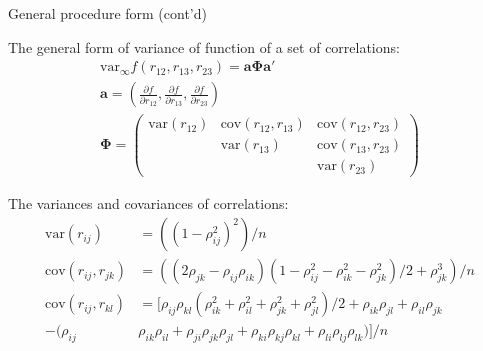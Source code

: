 \documentclass[10pt,pdf]{beamer}
\newcommand{\var}{\mathrm{var}}
\newcommand{\cov}{\mathrm{cov}}
\renewcommand{\vec}[1]{\mathbf{#1}}
\begin{document}
\begin{frame}[t]{General procedure form (cont’d)}

The general form of variance of function of a set of correlations:
\begin{gather*}
  \var_{\infty}f(r_{12}, r_{13}, r_{23}) = \vec{a} \boldsymbol{\Phi} \vec{a}' \\
  \boldsymbol{a} = \left( \frac{\partial f}{\partial r_{12}}, \frac{\partial f}{\partial r_{13}}, \frac{\partial f}{\partial r_{23}} \right) \\
  \boldsymbol{\Phi} =
  \left( \begin{array}{ccc}
    \var(r_{12}) & \cov(r_{12}, r_{13}) & \cov(r_{12}, r_{23}) \\
                 & \var(r_{13})         & \cov(r_{13}, r_{23}) \\
                 &                      & \var(r_{23})
  \end{array} \right)
\end{gather*}

\medskip

The variances and covariances of correlations:
\begin{align*}
  \var(r_{ij}) &= ((1 - \rho_{ij}^2)^2) / n \\
  \cov(r_{ij}, r_{jk}) &= ((2\rho_{jk} - \rho_{ij} \rho_{ik})(1 - \rho_{ij}^2 - \rho_{ik}^2 - \rho_{jk}^2) / 2 + \rho_{jk}^3) / n \\
  \cov(r_{ij}, r_{kl}) &= [\rho_{ij} \rho_{kl} (\rho_{ik}^2 + \rho_{il}^2 + \rho_{jk}^2 + \rho_{jl}^2) / 2 + \rho_{ik} \rho_{jl} + \rho_{il} \rho_{jk} \\
                       - (\rho_{ij}& \rho_{ik} \rho_{il} + \rho_{ji} \rho_{jk} \rho_{jl} + \rho_{ki} \rho_{kj} \rho_{kl} + \rho_{li} \rho_{lj} \rho_{lk})] / n
\end{align*}

\end{frame}

\end{document}
